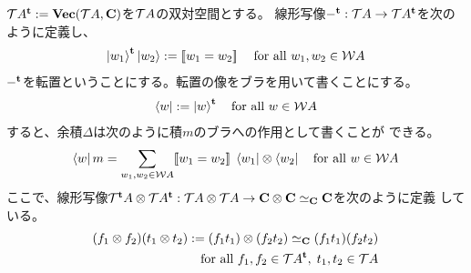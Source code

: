 	$\T A^\tran:=\Vect(\T A,\fukuso)$を$\T A$の双対空間とする。
	線形写像$-^\tran:\T A\to\T A^\tran$を次のように定義し、
	\begin{equation*}\begin{split}
		\ket{w_1}^\tran\ket{w_2} := \jump{w_1 = w_2}
		\quad\text{for all }w_1,w_2\in \W A
	\end{split}\end{equation*}
	$-^\tran$を転置ということにする。転置の像をブラを用いて書くことにする。
	\begin{equation*}\begin{split}
		\bra{w} := \ket{w}^\tran \quad\text{for all }w\in \W A
	\end{split}\end{equation*}
	すると、余積$\Delta$は次のように積$m$のブラへの作用として書くことが
	できる。
	\begin{equation*}\begin{split}
		\bra{w}m = \sum_{w_1,w_2\in\W A}\jump{w_1 = w_2}
		\bra{w_1}\otimes \bra{w_2} \quad\text{for all }w\in \W A
	\end{split}\end{equation*}
	ここで、線形写像$\T^\tran A\otimes \T A^\tran:\T A\otimes \T A
	\to \fukuso\otimes \fukuso\simeq_\fukuso \fukuso$を次のように定義
	している。
	\begin{equation*}\begin{split}
		(f_1\otimes f_2)(t_1\otimes t_2) := (f_1t_1)\otimes(f_2t_2)
		\simeq_\fukuso (f_1t_1)(f_2t_2) \\
		\quad\text{for all }f_1,f_2\in \T A^\tran,\;t_1,t_2\in \T A
	\end{split}\end{equation*}

